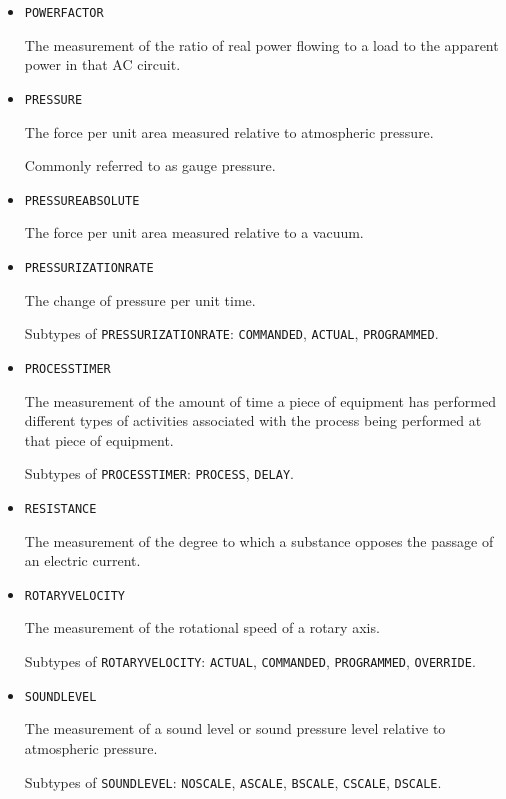 \begin{itemize}
\item \texttt{POWER\textunderscore FACTOR}  

The measurement of the ratio of real power flowing to a load to the apparent power in that AC circuit.


\item \texttt{PRESSURE}  

The force per unit area measured relative to atmospheric pressure. 

Commonly referred to as gauge pressure.


\item \texttt{PRESSURE\textunderscore ABSOLUTE}  

The force per unit area measured relative to a vacuum.


\item \texttt{PRESSURIZATION\textunderscore RATE}  

The change of pressure per unit time.

Subtypes of \texttt{PRESSURIZATION\textunderscore RATE}: \texttt{COMMANDED}, \texttt{ACTUAL}, \texttt{PROGRAMMED}.

\item \texttt{PROCESS\textunderscore TIMER}  

The measurement of the amount of time a piece of equipment has performed different types of activities associated with the process being performed at that piece of equipment.

Subtypes of \texttt{PROCESS\textunderscore TIMER}: \texttt{PROCESS}, \texttt{DELAY}.

\item \texttt{RESISTANCE}  

The measurement of the degree to which a substance opposes the passage of an electric current.


\item \texttt{ROTARY\textunderscore VELOCITY}  

The measurement of the rotational speed of a rotary axis.

Subtypes of \texttt{ROTARY\textunderscore VELOCITY}: \texttt{ACTUAL}, \texttt{COMMANDED}, \texttt{PROGRAMMED}, \texttt{OVERRIDE}.

\item \texttt{SOUND\textunderscore LEVEL}  

The measurement of a sound level or sound pressure level relative to atmospheric pressure.

Subtypes of \texttt{SOUND\textunderscore LEVEL}: \texttt{NO\textunderscore SCALE}, \texttt{A\textunderscore SCALE}, \texttt{B\textunderscore SCALE}, \texttt{C\textunderscore SCALE}, \texttt{D\textunderscore SCALE}.


\end{itemize}

